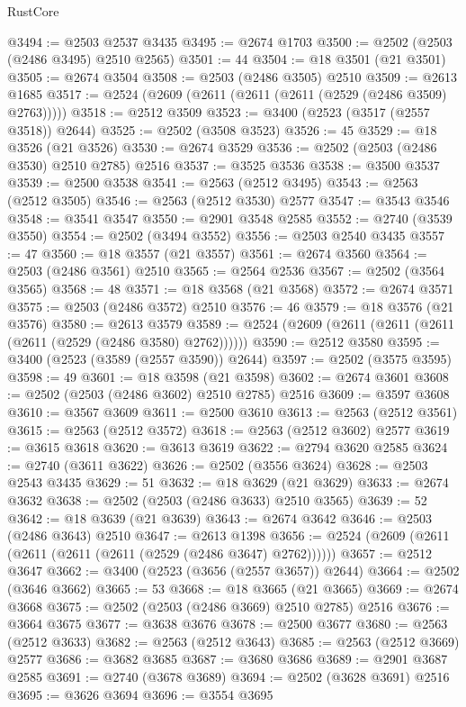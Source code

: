 \begin{lexlean}{RustCore}
\begin{coremodule}
@3494 := @2503 @2537 @3435
@3495 := @2674 @1703
@3500 := @2502 (@2503 (@2486 @3495) @2510 @2565)
@3501 := 44
@3504 := @18 @3501 (@21 @3501)
@3505 := @2674 @3504
@3508 := @2503 (@2486 @3505) @2510
@3509 := @2613 @1685
@3517 := @2524 (@2609 (@2611 (@2611 (@2611 (@2529 (@2486 @3509) @2763)))))
@3518 := @2512 @3509
@3523 := @3400 (@2523 (@3517 (@2557 @3518)) @2644)
@3525 := @2502 (@3508 @3523)
@3526 := 45
@3529 := @18 @3526 (@21 @3526)
@3530 := @2674 @3529
@3536 := @2502 (@2503 (@2486 @3530) @2510 @2785) @2516
@3537 := @3525 @3536
@3538 := @3500 @3537
@3539 := @2500 @3538
@3541 := @2563 (@2512 @3495)
@3543 := @2563 (@2512 @3505)
@3546 := @2563 (@2512 @3530) @2577
@3547 := @3543 @3546
@3548 := @3541 @3547
@3550 := @2901 @3548 @2585
@3552 := @2740 (@3539 @3550)
@3554 := @2502 (@3494 @3552)
@3556 := @2503 @2540 @3435
@3557 := 47
@3560 := @18 @3557 (@21 @3557)
@3561 := @2674 @3560
@3564 := @2503 (@2486 @3561) @2510
@3565 := @2564 @2536
@3567 := @2502 (@3564 @3565)
@3568 := 48
@3571 := @18 @3568 (@21 @3568)
@3572 := @2674 @3571
@3575 := @2503 (@2486 @3572) @2510
@3576 := 46
@3579 := @18 @3576 (@21 @3576)
@3580 := @2613 @3579
@3589 := @2524 (@2609 (@2611 (@2611 (@2611 (@2611 (@2529 (@2486 @3580) @2762))))))
@3590 := @2512 @3580
@3595 := @3400 (@2523 (@3589 (@2557 @3590)) @2644)
@3597 := @2502 (@3575 @3595)
@3598 := 49
@3601 := @18 @3598 (@21 @3598)
@3602 := @2674 @3601
@3608 := @2502 (@2503 (@2486 @3602) @2510 @2785) @2516
@3609 := @3597 @3608
@3610 := @3567 @3609
@3611 := @2500 @3610
@3613 := @2563 (@2512 @3561)
@3615 := @2563 (@2512 @3572)
@3618 := @2563 (@2512 @3602) @2577
@3619 := @3615 @3618
@3620 := @3613 @3619
@3622 := @2794 @3620 @2585
@3624 := @2740 (@3611 @3622)
@3626 := @2502 (@3556 @3624)
@3628 := @2503 @2543 @3435
@3629 := 51
@3632 := @18 @3629 (@21 @3629)
@3633 := @2674 @3632
@3638 := @2502 (@2503 (@2486 @3633) @2510 @3565)
@3639 := 52
@3642 := @18 @3639 (@21 @3639)
@3643 := @2674 @3642
@3646 := @2503 (@2486 @3643) @2510
@3647 := @2613 @1398
@3656 := @2524 (@2609 (@2611 (@2611 (@2611 (@2611 (@2529 (@2486 @3647) @2762))))))
@3657 := @2512 @3647
@3662 := @3400 (@2523 (@3656 (@2557 @3657)) @2644)
@3664 := @2502 (@3646 @3662)
@3665 := 53
@3668 := @18 @3665 (@21 @3665)
@3669 := @2674 @3668
@3675 := @2502 (@2503 (@2486 @3669) @2510 @2785) @2516
@3676 := @3664 @3675
@3677 := @3638 @3676
@3678 := @2500 @3677
@3680 := @2563 (@2512 @3633)
@3682 := @2563 (@2512 @3643)
@3685 := @2563 (@2512 @3669) @2577
@3686 := @3682 @3685
@3687 := @3680 @3686
@3689 := @2901 @3687 @2585
@3691 := @2740 (@3678 @3689)
@3694 := @2502 (@3628 @3691) @2516
@3695 := @3626 @3694
@3696 := @3554 @3695

\end{coremodule}
\end{lexlean}
